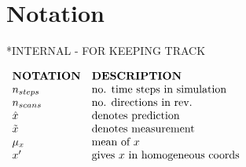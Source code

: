 \section{Notation}
*INTERNAL - FOR KEEPING TRACK

$
\begin{array}{ll}
	\textbf{NOTATION} 	& \textbf{DESCRIPTION}\\
	n_{steps}			& \textnormal{no. time steps in simulation}\\
	n_{scans}			& \textnormal{no. directions in rev.}\\
	\hat{x}	 			& \textnormal{denotes prediction}\\
	\tilde{x}	 		& \textnormal{denotes measurement}\\
	\mu_x		 		& \textnormal{mean of } x\\
	x'					& \textnormal{gives } x \textnormal{ in homogeneous coords}
\end{array}
$